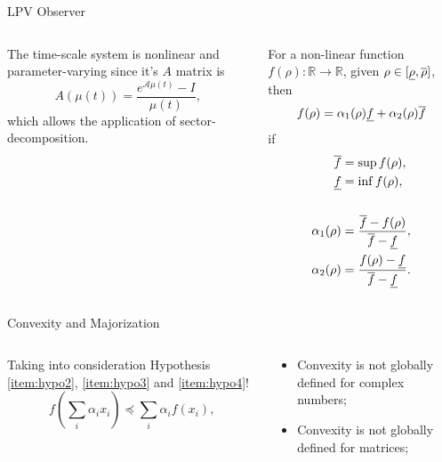 \begin{slide}{LPV Observer}
  \begin{columns}[c]
    \begin{column}{0.55\textwidth}
      The time-scale system is nonlinear and parameter-varying since it's \(A\)
      matrix is
      \begin{equation}
        A(\mu(t)) = \frac{e^{\mathcal{A}\mu(t)}-I}{\mu(t)},
      \end{equation}
      which allows the application of sector-decomposition.
    \end{column}%
    \hfill%
    \begin{column}{0.55\textwidth}
      For a non-linear function \(f(\rho):\mathbb{R}\rightarrow\mathbb{R}\), given
      \(\rho\in[\underline{\rho}, \overline{\rho}]\), then
      \begin{equation}
        f(\rho) = \alpha_{1}(\rho)\underline{f} + \alpha_{2}(\rho)\overline{f}
      \end{equation}
      if
      \begin{align}
        \overline{f}          & = \sup{f(\rho)},                             \\
        \underline{f}         & = \inf{f(\rho)},                             \\
        \nonumber                                                       \\
        \alpha_{1}(\rho) & = \frac{\overline{f}-f(\rho)}{\overline{f}-\underline{f}},  \\
        \alpha_{2}(\rho) & = \frac{f(\rho)-\underline{f}}{\overline{f}-\underline{f}}.
      \end{align}
    \end{column}%
  \end{columns}
\end{slide}

\begin{slide}{Convexity and Majorization}
  \begin{columns}[c]
    \begin{column}{0.55\textwidth}
      Taking into consideration Hypothesis \ref{item:hypo2}, \ref{item:hypo3}
      and \ref{item:hypo4}!
      \begin{equation}
        f(\sum_{i}\alpha_{i}x_{i}) \preceq \sum_{i}\alpha_{i}f(x_{i}),
      \end{equation}
    \end{column}%
    \hfill%
    \begin{column}{0.55\textwidth}
      \begin{itemize}
        \item Convexity is not globally defined for complex numbers;
        \item Convexity is not globally defined for matrices;
      \end{itemize}
    \end{column}%
  \end{columns}
\end{slide}

